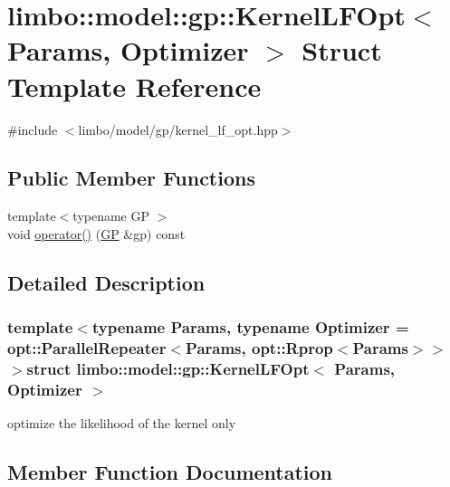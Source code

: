 \hypertarget{structlimbo_1_1model_1_1gp_1_1_kernel_l_f_opt}{}\section{limbo\+:\+:model\+:\+:gp\+:\+:Kernel\+L\+F\+Opt$<$ Params, Optimizer $>$ Struct Template Reference}
\label{structlimbo_1_1model_1_1gp_1_1_kernel_l_f_opt}


{\ttfamily \#include $<$limbo/model/gp/kernel\+\_\+lf\+\_\+opt.\+hpp$>$}

\subsection*{Public Member Functions}
\begin{DoxyCompactItemize}
\item 
{\footnotesize template$<$typename G\+P $>$ }\\void \hyperlink{structlimbo_1_1model_1_1gp_1_1_kernel_l_f_opt_a6d4fc16f320af9d298e2d2ab9c22e50a}{operator()} (\hyperlink{classlimbo_1_1model_1_1_g_p}{G\+P} \&gp) const 
\end{DoxyCompactItemize}


\subsection{Detailed Description}
\subsubsection*{template$<$typename Params, typename Optimizer = opt\+::\+Parallel\+Repeater$<$\+Params, opt\+::\+Rprop$<$\+Params$>$$>$$>$struct limbo\+::model\+::gp\+::\+Kernel\+L\+F\+Opt$<$ Params, Optimizer $>$}

optimize the likelihood of the kernel only 

\subsection{Member Function Documentation}
\hypertarget{structlimbo_1_1model_1_1gp_1_1_kernel_l_f_opt_a6d4fc16f320af9d298e2d2ab9c22e50a}{}

